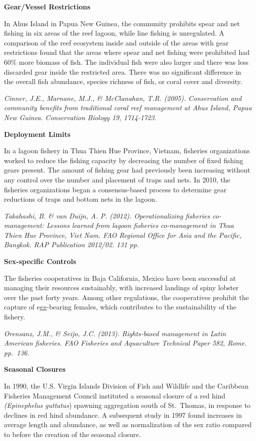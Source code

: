 \documentclass[]{book}
\begin{document}
\textbf{Gear/Vessel Restrictions}

In Ahus Island in Papua New Guinea, the community prohibits spear and
net fishing in six areas of the reef lagoon, while line fishing is
unregulated. A comparison of the reef ecosystem inside and outside of
the areas with gear restrictions found that the areas where spear and
net fishing were prohibited had 60\% more biomass of fish. The
individual fish were also larger and there was less discarded gear
inside the restricted area. There was no significant difference in the
overall fish abundance, species richness of fish, or coral cover and
diversity.

\emph{Cinner, J.E., Marnane, M.J., \& McClanahan, T.R. (2005).
Conservation and community benefits from traditional coral reef
management at Ahus Island, Papua New Guinea. Conservation Biology 19,
1714-1723.}

\textbf{Deployment Limits}

In a lagoon fishery in Thua Thien Hue Province, Vietnam, fisheries
organizations worked to reduce the fishing capacity by decreasing the
number of fixed fishing gears present. The amount of fishing gear had
previously been increasing without any control over the number and
placement of traps and nets. In 2010, the fisheries organizations began
a consensus-based process to determine gear reductions of traps and
bottom nets in the lagoon.

\emph{Takahashi, B. \& van Duijn, A. P. (2012). Operationalizing
fisheries co-management: Lessons learned from lagoon fisheries
co-management in Thua Thien Hue Province, Viet Nam. FAO Regional Office
for Asia and the Pacific, Bangkok. RAP Publication 2012/02. 131 pp.}

\textbf{Sex-specific Controls}

The fisheries cooperatives in Baja California, Mexico have been
successful at managing their resources sustainably, with increased
landings of spiny lobster over the past forty years. Among other
regulations, the cooperatives prohibit the capture of egg-bearing
females, which contributes to the sustainability of the fishery.

\emph{Orensanz, J.M., \& Seijo, J.C. (2013). Rights-based management in
Latin American fisheries. FAO Fisheries and Aquaculture Technical Paper
582, Rome. pp.~136.}

\textbf{Seasonal Closures}

In 1990, the U.S. Virgin Islands Division of Fish and Wildlife and the
Caribbean Fisheries Management Council instituted a seasonal closure of
a red hind \emph{(Epinephelus guttatus}) spawning aggregation south of
St.~Thomas, in response to declines in red hind abundance. A subsequent
study in 1997 found increases in average length and abundance, as well
as normalization of the sex ratio compared to before the creation of the
seasonal closure.
\end{document}
